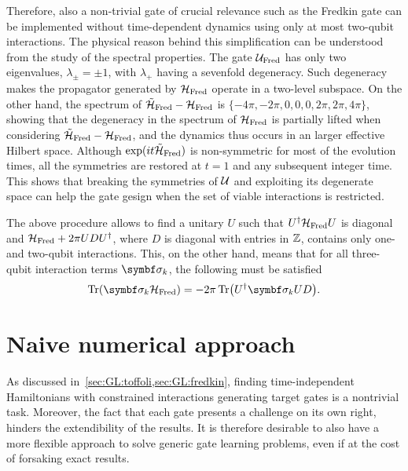 Therefore, also a non-trivial gate of crucial relevance such as the Fredkin gate can be implemented without time-dependent dynamics using only at most two-qubit interactions.
The physical reason behind this simplification can be understood from the study of the spectral properties.
The gate ${\mathcal{U}}_{\operatorname{Fred}}$ has only two eigenvalues, $\lambda_\pm=\pm1$,
with $\lambda_+$ having a sevenfold degeneracy. Such degeneracy makes the propagator generated by ${\mathcal{H}}_{\operatorname{Fred}}$ operate in a two-level subspace.
On the other hand, the spectrum of $\tilde{{\mathcal{H}}}_{\operatorname{Fred}}-{\mathcal{H}}_{\operatorname{Fred}}$ is $\{{-}4\pi,{-}2\pi,0,0,0,2\pi,2\pi,4\pi\}$, showing that the degeneracy in the spectrum of ${\mathcal{H}}_{\operatorname{Fred}}$ is partially lifted when considering 
$\tilde{{\mathcal{H}}}_{\operatorname{Fred}}-{\mathcal{H}}_{\operatorname{Fred}}$, and the dynamics thus occurs in an  larger effective Hilbert space.  %
Although $\exponential(it\HTildeFred)$ is non-symmetric for most of the evolution times, all the symmetries are restored at $t=1$ and any subsequent integer time. This  shows that breaking the symmetries of ${\mathcal{U}}$ and exploiting its degenerate space can help the gate gesign when the set of viable interactions is restricted.

The above procedure allows to find a unitary $U$ such that
$U^\dagger{\mathcal{H}}_{\operatorname{Fred}} U$ is diagonal and
${\mathcal{H}}_{\operatorname{Fred}} + 2\pi U D U^\dagger$, where $D$ is diagonal with entries in $\mathbb{Z}$, contains only one- and two-qubit interactions.
This, on the other hand, means that for all three-qubit interaction terms $\bs\sigma_k$, the following must be satisfied
\begin{equation}
    \Tr(\bs\sigma_k\HFred) = -2\pi \Tr(U^\dagger\bs\sigma_k U D).
\end{equation}



\section{Naive numerical approach}
\label{sec:GL:numerical_approach}

As discussed in~\cref{sec:GL:toffoli,sec:GL:fredkin}, finding time-independent Hamiltonians with constrained interactions generating target gates is a nontrivial task. 
Moreover, the fact that each gate presents a challenge on its own right, hinders the extendibility of the results.
It is therefore desirable to also have a more flexible approach to solve generic gate learning problems, even if at the cost of forsaking exact results.

